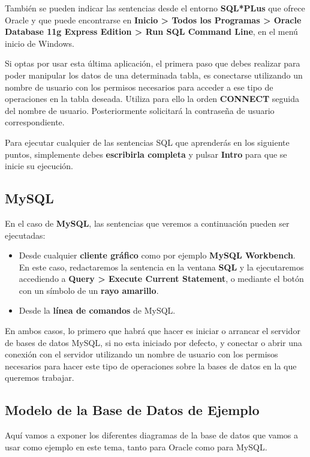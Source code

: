 También se pueden indicar las sentencias desde el entorno \textbf{SQL*PLus} que ofrece Oracle y que puede encontrarse  en \textbf{Inicio > Todos los Programas > Oracle Database 11g Express Edition > Run SQL Command Line}, en el menú inicio de Windows.

Si optas por usar esta última aplicación, el primera paso que debes realizar para poder manipular los datos de una determinada tabla, es conectarse utilizando un nombre de usuario con los permisos necesarios para acceder a ese tipo de operaciones en la tabla deseada. Utiliza para ello la orden \textbf{CONNECT} seguida del nombre de usuario. Posteriormente solicitará la contraseña de usuario correspondiente.

Para ejecutar cualquier de las sentencias SQL que aprenderás en los siguiente puntos, simplemente debes\textbf{ escribirla completa} y pulsar \textbf{Intro} para que se inicie su ejecución.

\subsection{MySQL}
En el caso de \textbf{MySQL}, las sentencias que veremos a continuación pueden ser ejecutadas:

\begin{itemize}
    \item Desde cualquier \textbf{cliente gráfico} como por ejemplo \textbf{MySQL Workbench}. En este caso, redactaremos la sentencia en la ventana \textbf{SQL} y la ejecutaremos accediendo a \textbf{Query > Execute Current Statement}, o mediante el botón con un símbolo de un \textbf{rayo amarillo}.
    \item Desde la \textbf{línea de comandos} de MySQL.
\end{itemize}

En ambos casos, lo primero que habrá que hacer es iniciar o arrancar el servidor de bases de datos MySQL, si no esta iniciado por defecto, y conectar o abrir una conexión con el servidor utilizando un nombre de usuario con los permisos necesarios para hacer este tipo de operaciones sobre la bases de datos en la que queremos trabajar.

\subsection{Modelo de la Base de Datos de Ejemplo}
Aquí vamos a exponer los diferentes diagramas de la base de datos que vamos a usar como ejemplo en este tema, tanto para Oracle como para MySQL.

